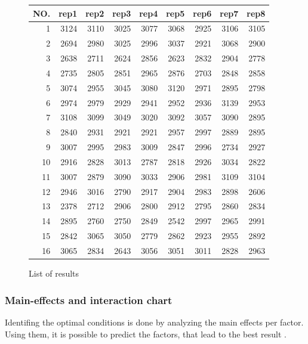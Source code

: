 \begin{figure}[H]
	\centering
	\begin{tabular}{ rrrrrrrrr  }
		\hline
		NO.& rep1 & rep2 & rep3 & rep4 & rep5 & rep6 & rep7 & rep8\\
		\hline
		1 & 3124 & 3110 & 3025 & 3077 & 3068 & 2925 & 3106 & 3105 \\ 
		2 & 2694 & 2980 & 3025 & 2996 & 3037 & 2921 & 3068 & 2900 \\ 
		3 & 2638 & 2711 & 2624 & 2856 & 2623 & 2832 & 2904 & 2778 \\ 
		4 & 2735 & 2805 & 2851 & 2965 & 2876 & 2703 & 2848 & 2858 \\ 
		5 & 3074 & 2955 & 3045 & 3080 & 3120 & 2971 & 2895 & 2798 \\ 
		6 & 2974 & 2979 & 2929 & 2941 & 2952 & 2936 & 3139 & 2953 \\ 
		7 & 3108 & 3099 & 3049 & 3020 & 3092 & 3057 & 3090 & 2895 \\ 
		8 & 2840 & 2931 & 2921 & 2921 & 2957 & 2997 & 2889 & 2895 \\ 
		9 & 3007 & 2995 & 2983 & 3009 & 2847 & 2996 & 2734 & 2927 \\ 
		10 & 2916 & 2828 & 3013 & 2787 & 2818 & 2926 & 3034 & 2822 \\ 
		11 & 3007 & 2879 & 3090 & 3033 & 2906 & 2981 & 3109 & 3104 \\ 
		12 & 2946 & 3016 & 2790 & 2917 & 2904 & 2983 & 2898 & 2606 \\ 
		13 & 2378 & 2712 & 2906 & 2800 & 2912 & 2795 & 2860 & 2834 \\ 
		14 & 2895 & 2760 & 2750 & 2849 & 2542 & 2997 & 2965 & 2991 \\ 
		15 & 2842 & 3065 & 3050 & 2779 & 2862 & 2923 & 2955 & 2892 \\ 
		16 & 3065 & 2834 & 2643 & 3056 & 3051 & 3011 & 2828 & 2963 \\ 
		\hline
	\end{tabular}
	\caption{List of results}
\end{figure}



\subsubsection{Main-effects and interaction chart}
Identifing the optimal conditions is done by analyzing the main effects per factor. Using them, it is possible to predict the factors, that lead to the best result \cite{roy_primer_1990}.



